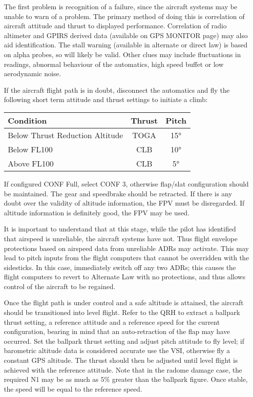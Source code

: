 \documentclass[a5paper,11pt,twoside]{book}
\begin{document}
The first problem is recognition of a failure, since the aircraft systems may be
unable to warn of a problem. The primary method of doing this is correlation of
aircraft attitude and thrust to displayed performance. Correlation of radio
altimeter and GPIRS derived data (available on GPS MONITOR page) may also aid
identification. The stall warning (available in alternate or direct law) is
based on alpha probes, so will likely be valid. Other clues may include
fluctuations in readings, abnormal behaviour of the automatics, high speed
buffet or low aerodynamic noise.

If the aircraft flight path is in doubt, disconnect the automatics and fly the
following short term attitude and thrust settings to initiate a climb:

\medskip
\begin{tabular}{|l|c|c|}
  \hline
  \textbf{Condition} & \textbf{Thrust} & \textbf{Pitch}\\\hline
  Below Thrust Reduction Altitude & TOGA & 15°\\\hline
  Below FL100 & CLB & 10°\\\hline
  Above FL100 & CLB & 5°\\\hline
\end{tabular}
\medskip

If configured CONF Full, select CONF 3, otherwise flap/slat configuration should
be maintained. The gear and speedbrake should be retracted. If there is any
doubt over the validity of altitude information, the FPV must be disregarded. If
altitude information is definitely good, the FPV may be used.

It is important to understand that at this stage, while the pilot has identified
that airspeed is unreliable, the aircraft systems have not. Thus flight envelope
protections based on airspeed data from unreliable ADRs may activate. This may
lead to pitch inputs from the flight computers that cannot be overridden with
the sidesticks. In this case, immediately switch off any two ADRs; this causes
the flight computers to revert to Alternate Law with no protections, and thus
allows control of the aircraft to be regained.

Once the flight path is under control and a safe altitude is attained, the
aircraft should be transitioned into level flight. Refer to the QRH to
extract a ballpark thrust setting, a reference attitude and a reference speed
for the current configuration, bearing in mind that an auto-retraction of the
flap may have occurred. Set the ballpark thrust setting and adjust pitch
attitude to fly level; if barometric altitude data is considered accurate use
the VSI, otherwise fly a constant GPS altitude. The thrust should then be
adjusted until level flight is achieved with the reference attitude. Note that
in the radome damage case, the required N1 may be as much as 5\% greater than
the ballpark figure. Once stable, the speed will be equal to the reference
speed.
\end{document}
